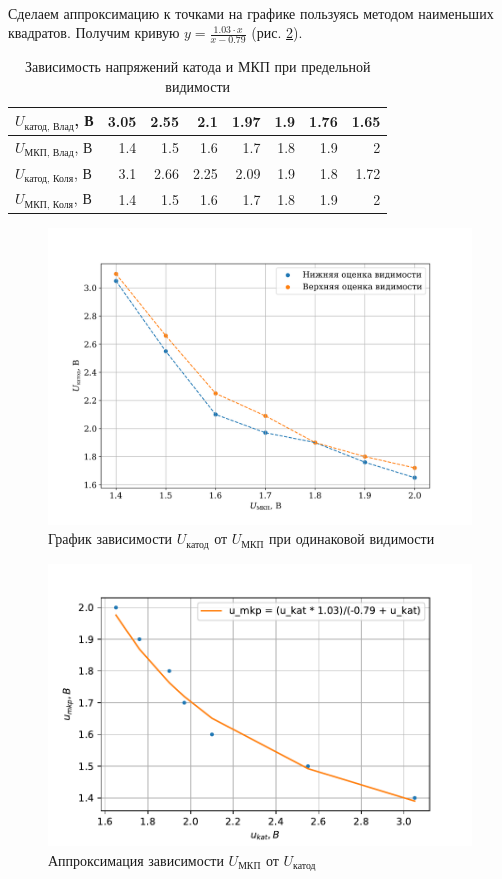 \documentclass[a4paper,12pt]{article} %
\begin{document}
\paragraph{} Сделаем аппроксимацию к точками на графике пользуясь методом наименьших квадратов. Получим кривую $y = \frac{1.03 \cdot x}{x - 0.79}$ (рис. \ref{fig:approx}).

\begin{table}[h]
\centering
\begin{tabular}{|l|r|r|r|r|r|r|r|}
\hline
$U_\text{катод, Влад}$, В & 3.05 & 2.55 & 2.1  & 1.97 & 1.9 & 1.76 & 1.65 \\ \hline
$U_\text{МКП, Влад}$, В   & 1.4  & 1.5  & 1.6  & 1.7  & 1.8 & 1.9  & 2    \\ \hline
$U_\text{катод, Коля}$, В & 3.1  & 2.66 & 2.25 & 2.09 & 1.9 & 1.8  & 1.72 \\ \hline
$U_\text{МКП, Коля}$, В   & 1.4  & 1.5  & 1.6  & 1.7  & 1.8 & 1.9  & 2    \\ \hline
\end{tabular}
\caption{Зависимость напряжений катода и МКП при предельной видимости}
\label{tab:my-table}
\end{table}

\begin{figure}[h]
\centering
\includegraphics[width=\textwidth]{plot_vis.png}
\caption{График зависимости $U_\text{катод}$ от $U_\text{МКП}$ при одинаковой видимости}
\label{fig:plot-vis}
\end{figure}

\begin{figure}
\centering
\includegraphics[width=\textwidth]{goodgame.pdf}
\caption{Аппроксимация зависимости $U_\text{МКП}$ от $U_\text{катод}$}
\label{fig:approx}
\end{figure}
\end{document}
